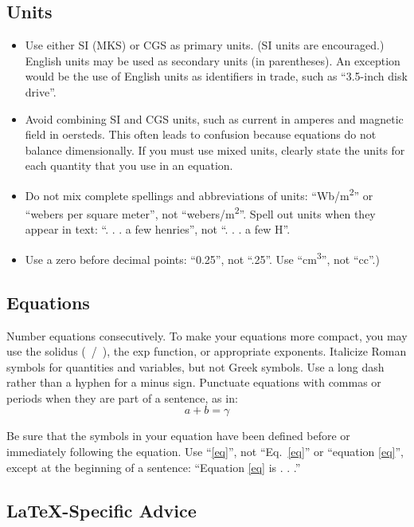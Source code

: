 \documentclass[conference, tikz]{IEEEtran}
\begin{document}
\subsection{Units}
\begin{itemize}
\item Use either SI (MKS) or CGS as primary units. (SI units are encouraged.) English units may be used as secondary units (in parentheses). An exception would be the use of English units as identifiers in trade, such as ``3.5-inch disk drive''.
\item Avoid combining SI and CGS units, such as current in amperes and magnetic field in oersteds. This often leads to confusion because equations do not balance dimensionally. If you must use mixed units, clearly state the units for each quantity that you use in an equation.
\item Do not mix complete spellings and abbreviations of units: ``Wb/m\textsuperscript{2}'' or ``webers per square meter'', not ``webers/m\textsuperscript{2}''. Spell out units when they appear in text: ``. . . a few henries'', not ``. . . a few H''.
\item Use a zero before decimal points: ``0.25'', not ``.25''. Use ``cm\textsuperscript{3}'', not ``cc''.)
\end{itemize}

\subsection{Equations}
Number equations consecutively. To make your 
\cite{handout}
equations more compact, you may use the solidus (~/~), the exp function, or 
appropriate exponents. Italicize Roman symbols for quantities and variables, 
but not Greek symbols. Use a long dash rather than a hyphen for a minus 
sign. Punctuate equations with commas or periods when they are part of a 
sentence, as in:
\begin{equation}
a+b=\gamma\label{eq}
\end{equation}

Be sure that the 
symbols in your equation have been defined before or immediately following 
the equation. Use ``\eqref{eq}'', not ``Eq.~\eqref{eq}'' or ``equation \eqref{eq}'', except at 
the beginning of a sentence: ``Equation \eqref{eq} is . . .''

\subsection{\LaTeX-Specific Advice}
\end{document}
